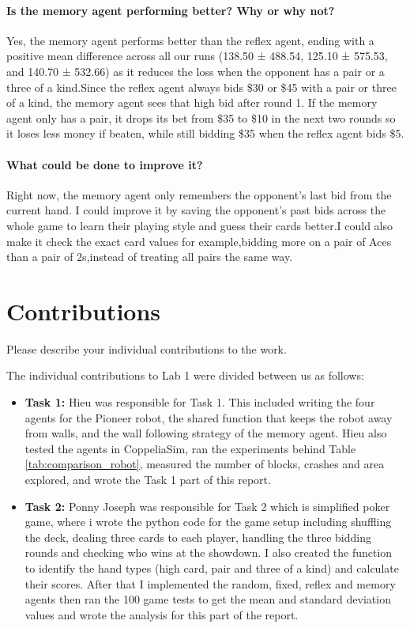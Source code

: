 \documentclass{article}
\begin{document}
\paragraph{Is the memory agent performing better? Why or why not?} Yes, the memory agent performs better than the reflex agent, ending with a positive mean difference across all our runs (138.50 ± 488.54, 125.10 ± 575.53, and 140.70 ± 532.66) as it reduces the loss when the opponent has a pair or a three of a kind.Since the reflex agent always bids \$30 or \$45 with a pair or three of a kind, the memory agent sees that high bid after round 1. If the memory agent only has a pair, it drops its bet from \$35 to \$10 in the next two rounds so it loses less money if beaten, while still bidding \$35 when the reflex agent bids \$5.

\paragraph{What could be done to improve it?} Right now, the memory agent only remembers the opponent's last bid from the current hand. I could improve it by saving the opponent's past bids across the whole game to learn their playing style and guess their cards better.I could also make it check the exact card values for example,bidding more on a pair of Aces than a pair of 2s,instead of treating all pairs the same way.

\section*{Contributions}

Please describe your individual contributions to the work.

\vspace{1em}
The individual contributions to Lab 1 were divided between us as follows:

\begin{itemize}
    \item \textbf{Task 1:} Hieu was responsible for Task 1. This included writing the four agents for the Pioneer robot, the shared function that keeps the robot away from walls, and the wall following strategy of the memory agent. Hieu also tested the agents in CoppeliaSim, ran the experiments behind Table \ref{tab:comparison_robot}, measured the number of blocks, crashes and area explored, and wrote the Task 1 part of this report.

    
    \item \textbf{Task 2:} Ponny Joseph was responsible for Task 2 which is simplified poker game, where i wrote the python code for the game setup including shuffling the deck, dealing three cards to each player, handling the three bidding rounds and checking who wins at the showdown. I also created the function to identify the hand types (high card, pair and three of a kind) and calculate their scores. After that I implemented the random, fixed, reflex and memory agents then ran the 100 game tests to get the mean and standard deviation values and wrote the analysis for this part of the report.
\end{itemize}
\end{document}
